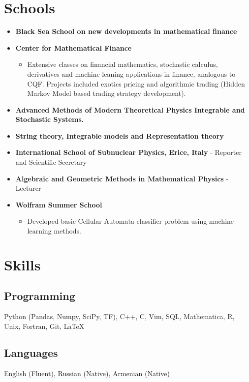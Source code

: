 \documentclass{article}
\begin{document}
\section{Schools}
\begin{itemize}
	\item \textbf{Black Sea School on new developments in mathematical finance}
	\item \textbf{Center for Mathematical Finance}
	\begin{itemize}
		\item Extensive classes on financial mathematics, stochastic calculus, derivatives and machine leaning applications in finance, analogous to CQF. Projects included exotics pricing and algorithmic trading (Hidden Markov Model based trading strategy development). 
		
	\end{itemize}

	\item \textbf{Advanced Methods of Modern Theoretical Physics Integrable and Stochastic Systems.}
	\item \textbf{String theory, Integrable models and Representation theory}
	\item \textbf{International School of Subnuclear Physics, Erice, Italy} - Reporter and Scientific Secretary
	\item \textbf{Algebraic and Geometric Methods in Mathematical Physics} - Lecturer
	
	\item \textbf{Wolfram Summer School}
	
	
	
	\begin{itemize}
		\item Developed basic Cellular Automata classifier problem using machine learning methods.
		
	\end{itemize}
	
\end{itemize}









\section{Skills}
\subsection{Programming}
Python (Pandas, Numpy, SciPy, TF), C++, C, Vim, SQL, Mathematica, R, Unix, Fortran, Git, \LaTeX
\subsection{Languages}
English (Fluent), Russian (Native), Armenian (Native)
\end{document}
